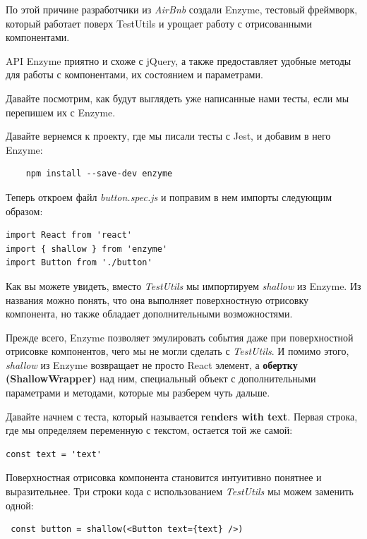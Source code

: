 По этой причине разработчики из \textit{AirBnb} создали Enzyme, тестовый фреймворк, который работает поверх TestUtils и урощает работу с отрисованными компонентами.

API Enzyme приятно и схоже с jQuery, а также предоставляет удобные методы для работы с компонентами, их состоянием и параметрами.

Давайте посмотрим, как будут выглядеть уже написанные нами тесты, если мы перепишем их с Enzyme.

Давайте вернемся к проекту, где мы писали тесты с Jest, и добавим в него Enzyme:

\begin{lstlisting}
	npm install --save-dev enzyme
\end{lstlisting}

Теперь откроем файл \textit{button.spec.js} и поправим в нем импорты следующим образом:

\begin{lstlisting}
import React from 'react'
import { shallow } from 'enzyme'
import Button from './button'
\end{lstlisting}

Как вы можете увидеть, вместо \textit{TestUtils} мы импортируем \textit{shallow} из Enzyme. Из названия можно понять, что она выполняет поверхностную отрисовку компонента, но также обладает дополнительными возможностями.

Прежде всего, Enzyme позволяет эмулировать события даже при поверхностной отрисовке компонентов, чего мы не могли сделать с \textit{TestUtils}. И помимо этого, \textit{shallow} из Enzyme возвращает не просто React элемент, а \textbf{обертку (ShallowWrapper)} над ним, специальный объект с дополнительными параметрами и методами, которые мы разберем чуть дальше.

Давайте начнем с теста, который называется \textbf{renders with text}. Первая строка, где мы определяем переменную с текстом, остается той же самой:

\begin{lstlisting}
const text = 'text'
\end{lstlisting}

Поверхностная отрисовка компонента становится интуитивно понятнее и выразительнее. Три строки кода с использованием \textit{TestUtils} мы можем заменить одной:

\begin{lstlisting}
 const button = shallow(<Button text={text} />)
\end{lstlisting}

